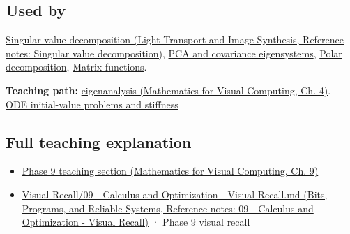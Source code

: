 \subsection{Used by}\label{appendix-0b3be18411f9-used-by}

\hypertarget{appendix-0b3be18411f9-used-by}{}

\href{../04-Light-Transport-and-Image-Synthesis/main.pdf\#nameddest=appendix-1fad5e7f36fa}{Singular value decomposition (Light Transport and Image Synthesis, Reference notes: Singular value decomposition)}, \hyperref[appendix-ad175ef3c5bf]{PCA and covariance eigensystems}, \hyperref[appendix-73f5bcf7a462]{Polar decomposition}, \hyperref[appendix-0f4bc2bf2b1f]{Matrix functions}.

\textbf{Teaching path:} \href{../02-Mathematics-for-Visual-Computing/main.pdf\#nameddest=01-foundations-i-ch020-eigenvectors-reveal-the-directions-a-square-map-does-not-turn}{eigenanalysis (Mathematics for Visual Computing, Ch. 4)}. - \hyperref[appendix-e8ab9836882e]{ODE initial-value problems and stiffness}

\subsection{Full teaching explanation}\label{appendix-0b3be18411f9-full-teaching-explanation}

\hypertarget{appendix-0b3be18411f9-full-teaching-explanation}{}

\begin{itemize}
\tightlist
\item
  \href{../02-Mathematics-for-Visual-Computing/main.pdf\#nameddest=02-foundations-ii-ch025-odes-and-numerical-simulation}{Phase 9 teaching section (Mathematics for Visual Computing, Ch. 9)}
\item
  \href{../01-Bits-Programs-and-Reliable-Systems/main.pdf\#nameddest=appendix-adf48f5dc5c1}{Visual Recall/09 - Calculus and Optimization - Visual Recall.md (Bits, Programs, and Reliable Systems, Reference notes: 09 - Calculus and Optimization - Visual Recall)} · Phase 9 visual recall
\end{itemize}
